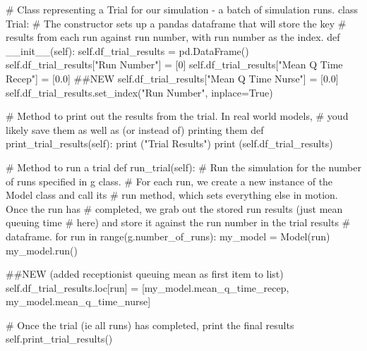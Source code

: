 \documentclass[
  letterpaper,
  DIV=11,
  numbers=noendperiod]{scrreprt}
\newenvironment{Shaded}{}{}
\newcommand{\BuiltInTok}[1]{\textcolor[rgb]{0.84,0.23,0.29}{#1}}
\newcommand{\CommentTok}[1]{\textcolor[rgb]{0.42,0.45,0.49}{#1}}
\newcommand{\ControlFlowTok}[1]{\textcolor[rgb]{0.84,0.23,0.29}{#1}}
\newcommand{\DecValTok}[1]{\textcolor[rgb]{0.00,0.36,0.77}{#1}}
\newcommand{\FloatTok}[1]{\textcolor[rgb]{0.00,0.36,0.77}{#1}}
\newcommand{\FunctionTok}[1]{\textcolor[rgb]{0.44,0.26,0.76}{#1}}
\newcommand{\KeywordTok}[1]{\textcolor[rgb]{0.84,0.23,0.29}{#1}}
\newcommand{\NormalTok}[1]{\textcolor[rgb]{0.14,0.16,0.18}{#1}}
\newcommand{\OperatorTok}[1]{\textcolor[rgb]{0.14,0.16,0.18}{#1}}
\newcommand{\StringTok}[1]{\textcolor[rgb]{0.01,0.18,0.38}{#1}}
\newcommand{\VariableTok}[1]{\textcolor[rgb]{0.89,0.38,0.04}{#1}}
\begin{document}
\begin{tcolorbox}
\begin{Shaded}
\begin{Highlighting}[]
\CommentTok{\# Class representing a Trial for our simulation {-} a batch of simulation runs.}
\KeywordTok{class}\NormalTok{ Trial:}
    \CommentTok{\# The constructor sets up a pandas dataframe that will store the key}
    \CommentTok{\# results from each run against run number, with run number as the index.}
    \KeywordTok{def}  \FunctionTok{\_\_init\_\_}\NormalTok{(}\VariableTok{self}\NormalTok{):}
        \VariableTok{self}\NormalTok{.df\_trial\_results }\OperatorTok{=}\NormalTok{ pd.DataFrame()}
        \VariableTok{self}\NormalTok{.df\_trial\_results[}\StringTok{"Run Number"}\NormalTok{] }\OperatorTok{=}\NormalTok{ [}\DecValTok{0}\NormalTok{]}
        \VariableTok{self}\NormalTok{.df\_trial\_results[}\StringTok{"Mean Q Time Recep"}\NormalTok{] }\OperatorTok{=}\NormalTok{ [}\FloatTok{0.0}\NormalTok{] }\CommentTok{\#\#NEW}
        \VariableTok{self}\NormalTok{.df\_trial\_results[}\StringTok{"Mean Q Time Nurse"}\NormalTok{] }\OperatorTok{=}\NormalTok{ [}\FloatTok{0.0}\NormalTok{]}
        \VariableTok{self}\NormalTok{.df\_trial\_results.set\_index(}\StringTok{"Run Number"}\NormalTok{, inplace}\OperatorTok{=}\VariableTok{True}\NormalTok{)}

    \CommentTok{\# Method to print out the results from the trial.  In real world models,}
    \CommentTok{\# you\textquotesingle{}d likely save them as well as (or instead of) printing them}
    \KeywordTok{def}\NormalTok{ print\_trial\_results(}\VariableTok{self}\NormalTok{):}
        \BuiltInTok{print}\NormalTok{ (}\StringTok{"Trial Results"}\NormalTok{)}
        \BuiltInTok{print}\NormalTok{ (}\VariableTok{self}\NormalTok{.df\_trial\_results)}

    \CommentTok{\# Method to run a trial}
    \KeywordTok{def}\NormalTok{ run\_trial(}\VariableTok{self}\NormalTok{):}
        \CommentTok{\# Run the simulation for the number of runs specified in g class.}
        \CommentTok{\# For each run, we create a new instance of the Model class and call its}
        \CommentTok{\# run method, which sets everything else in motion.  Once the run has}
        \CommentTok{\# completed, we grab out the stored run results (just mean queuing time}
        \CommentTok{\# here) and store it against the run number in the trial results}
        \CommentTok{\# dataframe.}
        \ControlFlowTok{for}\NormalTok{ run }\KeywordTok{in} \BuiltInTok{range}\NormalTok{(g.number\_of\_runs):}
\NormalTok{            my\_model }\OperatorTok{=}\NormalTok{ Model(run)}
\NormalTok{            my\_model.run()}

            \CommentTok{\#\#NEW (added receptionist queuing mean as first item to list)}
            \VariableTok{self}\NormalTok{.df\_trial\_results.loc[run] }\OperatorTok{=}\NormalTok{ [my\_model.mean\_q\_time\_recep,}
\NormalTok{                                              my\_model.mean\_q\_time\_nurse]}

        \CommentTok{\# Once the trial (ie all runs) has completed, print the final results}
        \VariableTok{self}\NormalTok{.print\_trial\_results()}
\end{Highlighting}
\end{Shaded}

\end{tcolorbox}
\end{document}
